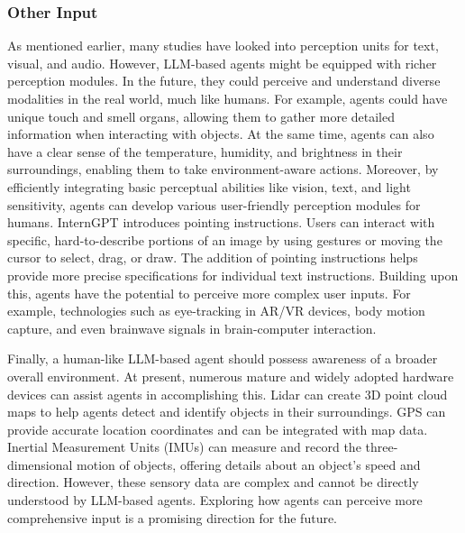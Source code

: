 \subsubsection{Other Input}\label{sec:Others Input}
As mentioned earlier, many studies have looked into perception units for text, visual, and audio. However, LLM-based agents might be equipped with richer perception modules. In the future, they could perceive and understand diverse modalities in the real world, much like humans. For example, agents could have unique touch and smell organs, allowing them to gather more detailed information when interacting with objects. At the same time, agents can also have a clear sense of the temperature, humidity, and brightness in their surroundings, enabling them to take environment-aware actions. Moreover, by efficiently integrating basic perceptual abilities like vision, text, and light sensitivity, agents can develop various user-friendly perception modules for humans. InternGPT \cite{DBLP:journals/corr/abs-2305-05662} introduces pointing instructions. Users can interact with specific, hard-to-describe portions of an image by using gestures or moving the cursor to select, drag, or draw. The addition of pointing instructions helps provide more precise specifications for individual text instructions. Building upon this, agents have the potential to perceive more complex user inputs. For example, technologies such as eye-tracking in AR/VR devices, body motion capture, and even brainwave signals in brain-computer interaction.

Finally, a human-like LLM-based agent should possess awareness of a broader overall environment.  At present, numerous mature and widely adopted hardware devices can assist agents in accomplishing this. Lidar \cite{schwarz2010mapping} can create 3D point cloud maps to help agents detect and identify objects in their surroundings. GPS \cite{parkinson1996progress} can provide accurate location coordinates and can be integrated with map data. Inertial Measurement Units (IMUs) can measure and record the three-dimensional motion of objects, offering details about an object's speed and direction. However, these sensory data are complex and cannot be directly understood by LLM-based agents. Exploring how agents can perceive more comprehensive input is a promising direction for the future.



